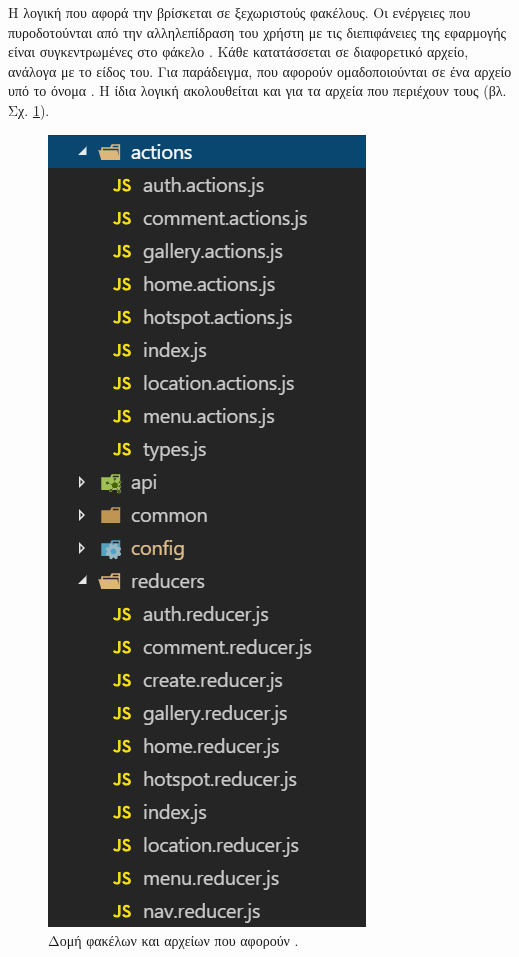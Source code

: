 Η λογική που αφορά την  βρίσκεται σε ξεχωριστούς φακέλους. Οι ενέργειες που πυροδοτούνται από την αλληλεπίδραση του χρήστη με τις διεπιφάνειες της εφαρμογής είναι συγκεντρωμένες στο φάκελο . Κάθε  κατατάσσεται σε διαφορετικό αρχείο, ανάλογα με το είδος του. Για παράδειγμα,  που αφορούν  ομαδοποιούνται σε ένα αρχείο υπό το όνομα . Η ίδια λογική ακολουθείται και για τα αρχεία που περιέχουν τους  (βλ. Σχ. \ref{redux}).

\begin{figure}[H]
    \centering
    \includegraphics[scale=0.7]{figures/redux.png}
    \caption{Δομή φακέλων και αρχείων που αφορούν .}
    \label{redux}
\end{figure}


